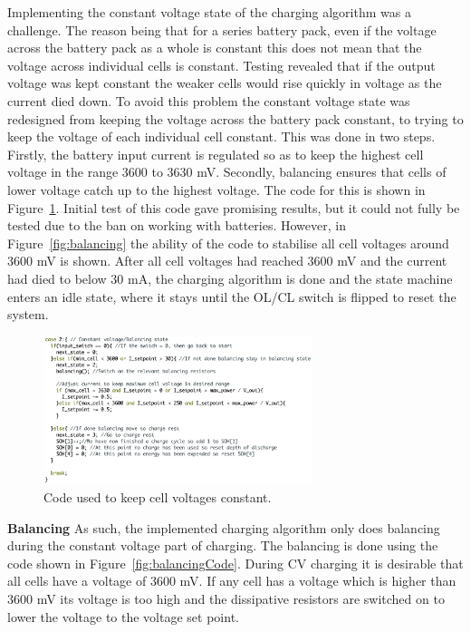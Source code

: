 \documentclass[a4paper]{article}
\begin{document}
Implementing the constant voltage state of the charging algorithm was a challenge. The
reason being that for a series battery pack, even if the voltage across the battery pack
as a whole is constant this does not mean that the voltage across individual cells is constant.
Testing revealed that if the output voltage was kept constant the weaker cells would rise 
quickly in voltage as the current died down. To avoid this problem the constant voltage
state was redesigned from keeping the voltage across the battery pack constant, to trying
to keep the voltage of each individual cell constant. This was done in two steps. Firstly,
the battery input current is regulated so as to keep the highest cell voltage in the range
3600 to 3630 mV. Secondly, balancing ensures that cells of lower voltage catch up to the highest
voltage. The code for this is shown in Figure~\ref{fig:Constant_Voltage}. Initial test of this code
gave promising results, but it could not fully be tested due to the ban on working with batteries.
However, in Figure~\ref{fig:balancing} the ability of the code to stabilise all cell voltages
around 3600 mV is shown. After all cell voltages had reached 3600 mV and the current had died
to below 30 mA, the charging algorithm is done and the state machine enters an idle state, where
it stays until the OL/CL switch is flipped to reset the system.

\begin{figure}[H]
    \centering
    \includegraphics[width = 0.7\textwidth]{Constant_voltage.png}
    \caption{Code used to keep cell voltages constant.}
    \vspace{-10pt}
    \label{fig:Constant_Voltage}
\end{figure}


\textbf{Balancing}
\vspace{10pt} 
\newline
As such, the 
implemented charging algorithm only does balancing during the constant 
voltage part of charging. The balancing is done using the code shown in 
Figure~\ref{fig:balancingCode}. During CV charging it is desirable that all cells have a voltage 
of 3600 mV. If any cell has a voltage which is higher than 3600 mV its 
voltage is too high and the dissipative resistors are switched on to lower 
the voltage to the voltage set point. 
\end{document}
